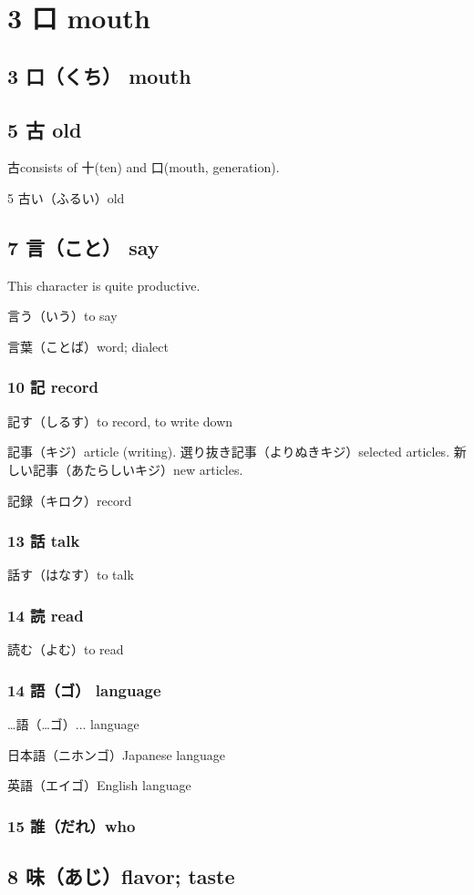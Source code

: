 \chapter{3 口 mouth}

\section{3 口（くち） mouth}

\section{5 古 old}

古consists of 十(ten) and 口(mouth, generation).

5 古い（ふるい）old

\section{7 言（こと） say}

This character is quite productive.

言う（いう）to say

言葉（ことば）word; dialect

\subsection{10 記 record}

記す（しるす）to record, to write down

記事（キジ）article (writing).
選り抜き記事（よりぬきキジ）selected articles.
新しい記事（あたらしいキジ）new articles.

記録（キロク）record

\subsection{13 話 talk}

話す（はなす）to talk

\subsection{14 読 read}

読む（よむ）to read

\subsection{14 語（ゴ） language}

…語（…ゴ）... language

日本語（ニホンゴ）Japanese language

英語（エイゴ）English language

\subsection{15 誰（だれ）who}

\section{8 味（あじ）flavor; taste}
